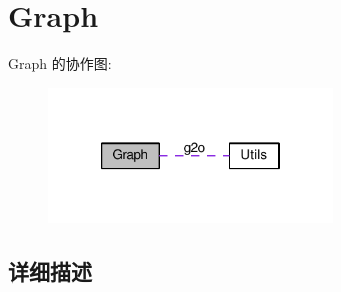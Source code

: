 \hypertarget{group__graph}{\section{Graph}
\label{group__graph}
}
Graph 的协作图\-:
\nopagebreak
\begin{figure}[H]
\begin{center}
\leavevmode
\includegraphics[width=214pt]{group__graph}
\end{center}
\end{figure}


\subsection{详细描述}
